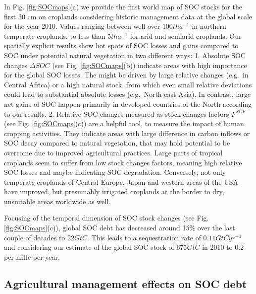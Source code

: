 \documentclass[gc, manuscript]{copernicus}
\begin{document}
In Fig. \ref{fig:SOCmaps}(a) we provide the first world map of SOC stocks for the first 30 cm on croplands considering historic management data at the global scale for the year 2010. Values ranging between well over \(100\unit{t ha^{-1}}\) in northern temperate croplands, to less than \(5\unit{t ha^{-1}}\) for arid and semiarid croplands.
Our spatially explicit results show hot spots of SOC losses and gains compared to SOC under potential natural vegetation in two different ways:
1. Absolute SOC changes \(\Delta SOC\) (see Fig. \ref{fig:SOCmaps}(b)) indicate areas with high importance for the global SOC losses. The might be driven by large relative changes (e.g.~in Central Africa) or a high natural stock, from which even small relative deviations could lead to substantial absolute losses (e.g.~North-east Asia). In contrast, large net gains of SOC happen primarily in developed countries of the North according to our results.
2. Relative SOC changes measured as stock changes factors \(F^{SCF}\) (see Fig. \ref{fig:SOCmaps}(c)) are a helpful tool, to measure the impact of human cropping activities. They indicate areas with large difference in carbon inflows or SOC decay compared to natural vegetation, that may hold potential to be overcome due to improved agricultural practices. Large parts of tropical croplands seem to suffer from low stock changes factors, meaning high relative SOC losses and maybe indicating SOC degradation. Conversely, not only temperate croplands of Central Europe, Japan and western areas of the USA have improved, but presumably irrigated croplands at the border to dry, unsuitable areas worldwide as well.

Focusing of the temporal dimension of SOC stock changes (see Fig. \ref{fig:SOCmaps}(c)), global SOC debt has decreased around 15\% over the last couple of decades to \(22\unit{GtC}\). This leads to a sequestration rate of \(0.11\unit{GtC yr^{-1}}\) and considering our estimate of the global SOC stock of \(675\unit{GtC}\) in 2010 to \(0.2\) per mille per year.

\hypertarget{agricultural-management-effects-on-soc-debt}{%
\subsection{Agricultural management effects on SOC debt}\label{agricultural-management-effects-on-soc-debt}}
\end{document}

